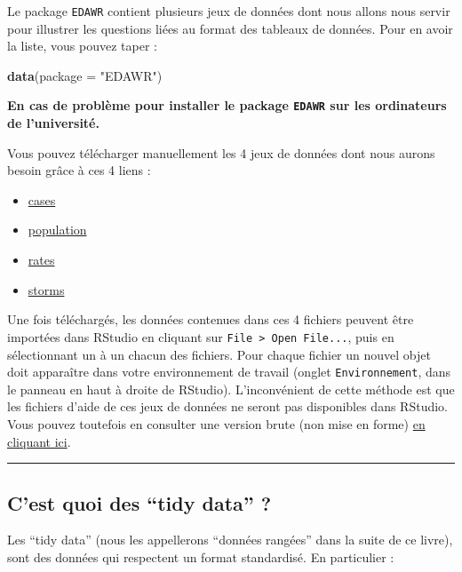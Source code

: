 \documentclass[a4paperpaper,]{article}
\newenvironment{Shaded}{\begin{snugshade}}{\end{snugshade}}
\newcommand{\DataTypeTok}[1]{\textcolor[rgb]{0.00,0.34,0.68}{#1}}
\newcommand{\KeywordTok}[1]{\textcolor[rgb]{0.12,0.11,0.11}{\textbf{#1}}}
\newcommand{\NormalTok}[1]{\textcolor[rgb]{0.12,0.11,0.11}{#1}}
\newcommand{\StringTok}[1]{\textcolor[rgb]{0.75,0.01,0.01}{#1}}
\providecommand{\tightlist}{%
  \setlength{\itemsep}{0pt}\setlength{\parskip}{0pt}}
\begin{document}
Le package \texttt{EDAWR} contient plusieurs jeux de données dont nous allons nous servir pour illustrer les questions liées au format des tableaux de données. Pour en avoir la liste, vous pouvez taper :

\begin{Shaded}
\begin{Highlighting}[]
\KeywordTok{data}\NormalTok{(}\DataTypeTok{package =} \StringTok{"EDAWR"}\NormalTok{)}
\end{Highlighting}
\end{Shaded}

\textbf{En cas de problème pour installer le package \texttt{EDAWR} sur les ordinateurs de l'université.}

Vous pouvez télécharger manuellement les 4 jeux de données dont nous aurons besoin grâce à ces 4 liens :

\begin{itemize}
\tightlist
\item
  \href{data/cases.rdata}{cases}
\item
  \href{data/population.rdata}{population}
\item
  \href{data/rates.rdata}{rates}
\item
  \href{data/storms.rdata}{storms}
\end{itemize}

Une fois téléchargés, les données contenues dans ces 4 fichiers peuvent être importées dans RStudio en cliquant sur \texttt{File\ \textgreater{}\ Open\ File...}, puis en sélectionnant un à un chacun des fichiers. Pour chaque fichier un nouvel objet doit apparaître dans votre environnement de travail (onglet \texttt{Environnement}, dans le panneau en haut à droite de RStudio). L'inconvénient de cette méthode est que les fichiers d'aide de ces jeux de données ne seront pas disponibles dans RStudio. Vous pouvez toutefois en consulter une version brute (non mise en forme) \href{https://github.com/rstudio/EDAWR/tree/master/man}{en cliquant ici}.

\begin{center}\rule{0.5\linewidth}{\linethickness}\end{center}

\hypertarget{cest-quoi-des-tidy-data}{%
\subsection{C'est quoi des ``tidy data'' ?}\label{cest-quoi-des-tidy-data}}

Les ``tidy data'' (nous les appellerons ``données rangées'' dans la suite de ce livre), sont des données qui respectent un format standardisé. En particulier :
\end{document}

